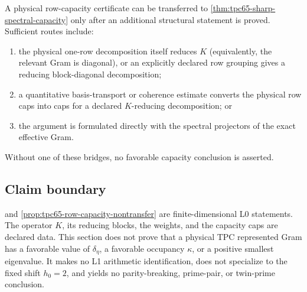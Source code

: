 \begin{remark}
\label{rem:tpc65-valid-recovery}
A physical row-capacity certificate can be transferred to
\cref{thm:tpc65-sharp-spectral-capacity} only after an additional structural
statement is proved.  Sufficient routes include:
\begin{enumerate}
  \item the physical one-row decomposition itself reduces \(K\) (equivalently,
  the relevant Gram is diagonal), or an explicitly declared row grouping gives
  a reducing block-diagonal decomposition;
  \item a quantitative basis-transport or coherence estimate converts the
  physical row caps into caps for a declared \(K\)-reducing decomposition; or
  \item the argument is formulated directly with the spectral projectors of
  the exact effective Gram.
\end{enumerate}
Without one of these bridges, no favorable capacity conclusion is asserted.
\end{remark}

\subsection{Claim boundary}

 and
\cref{prop:tpc65-row-capacity-nontransfer} are finite-dimensional L0
statements.  The operator \(K\), its reducing blocks, the weights, and the
capacity caps are declared data.  This section does not prove that a physical
TPC represented Gram has a favorable value of \(\delta_\eta\), a favorable
occupancy \(\kappa\), or a positive smallest eigenvalue.  It makes no L1
arithmetic identification, does not specialize to the fixed shift \(h_0=2\),
and yields no parity-breaking, prime-pair, or twin-prime conclusion.
